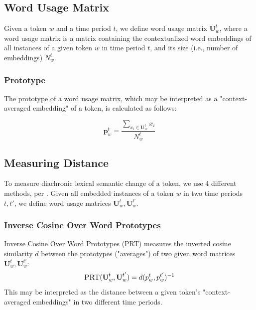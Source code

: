 \documentclass[10pt, a4paper]{article}
\begin{document}
\subsection{Word Usage Matrix}
Given a token $w$ and a time period $t$, we define word usage matrix $\textbf{U}^{t}_w$, where a word usage matrix is a matrix containing the contextualized word embeddings of all instances of a given token $w$ in time period $t$, and its size (i.e., number of embeddings) $N^t_w$.

\subsubsection{Prototype}
The prototype of a word usage matrix, which may be interpreted as a "context-averaged embedding" of a token, is calculated as follows:

$$\textbf{p}^t_w = \frac{\sum_{x_i \in \textbf{U}^t_w} x_i}{N^t_w}$$

\subsection{Measuring Distance}
\label{distance}
To measure diachronic lexical semantic change of a token, we use 4 different methods, per \cite{Kutuzov2020,Giulianelli2020}. Given all embedded instances of a token $w$ in two time periods $t, t'$, we define word usage matrices $\textbf{U}^{t}_w, \textbf{U}^{t'}_w$.

\subsubsection{Inverse Cosine Over Word Prototypes}
Inverse Cosine Over Word Prototypes (PRT) measures the inverted cosine similarity $d$ between the prototypes ("averages") of two given word matrices $\textbf{U}^{t}_w, \textbf{U}^{t'}_w$:
$$\textsc{PRT}(\textbf{U}^{t}_w, \textbf{U}^{t'}_w) = d(p^{t}_w, p^{t'}_w)^{-1}$$
This may be interpreted as the distance between a given token's "context-averaged embeddings" in two different time periods.
\end{document}
